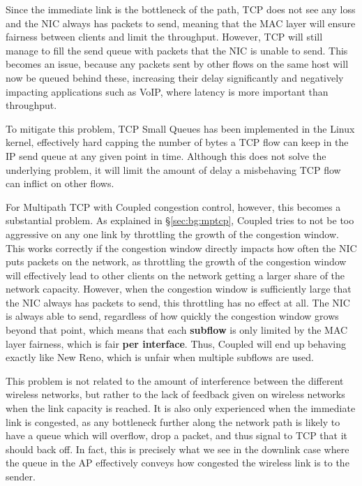 Since the immediate link is the bottleneck of the path, TCP does not see any loss and the NIC always has packets to send, meaning that the MAC layer will ensure fairness between clients and limit the throughput.
However, TCP will still manage to fill the send queue with packets that the NIC
is unable to send. This becomes an issue, because any packets sent by other
flows on the same host will now be queued behind these, increasing their delay
significantly and negatively impacting applications such as VoIP, where latency
is more important than throughput.

To mitigate this problem, TCP Small Queues has been implemented in the Linux
kernel, effectively hard capping the number of bytes a TCP flow can keep in the
IP send queue at any given point in time.  Although this does not solve the
underlying problem, it will limit the amount of delay a misbehaving TCP flow can
inflict on other flows.

For Multipath TCP with Coupled congestion control, however, this becomes a
substantial problem. As explained in \S\ref{sec:bg:mptcp}, Coupled tries to not be too 
aggressive on any one link by throttling the growth of the congestion window.
This works correctly if the congestion window directly impacts how often the NIC 
puts packets on the network, as throttling the growth of the congestion window 
will effectively lead to other clients on the network getting a larger share of 
the network capacity. However, when the congestion window is sufficiently large 
that the NIC always has packets to send, this throttling has no effect at all. 
The NIC is always able to send, regardless of how quickly the congestion window grows 
beyond that point, which means that each \textbf{subflow} is only limited by the 
MAC layer fairness, which is fair \textbf{per interface}. Thus, Coupled will end 
up behaving exactly like New Reno, which is unfair when multiple subflows are 
used.

This problem is not related to the amount of interference between the different
wireless networks, but rather to the lack of feedback given on
wireless networks when the link capacity is reached. It is also only experienced
when the immediate link is congested, as any bottleneck further along the network
path is likely to have a queue which will overflow, drop a packet, and thus
signal to TCP that it should back off. In fact, this is precisely what we see in
the downlink case where the queue in the AP effectively conveys how congested
the wireless link is to the sender.

